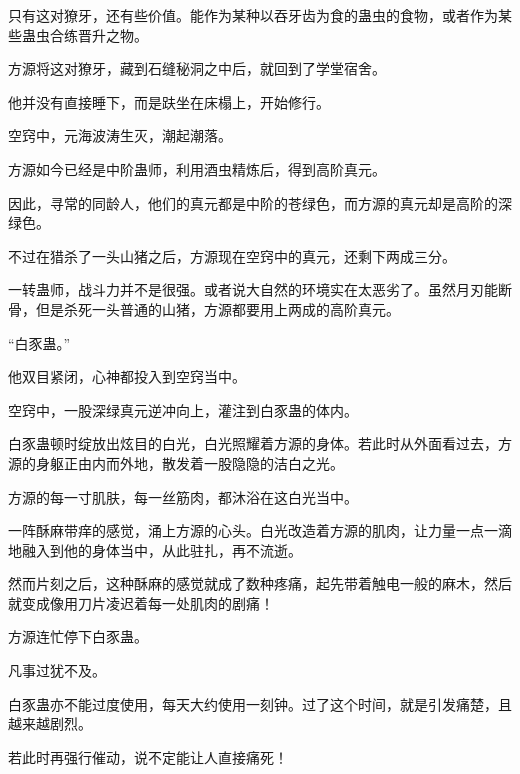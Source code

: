 \begin{this_body}
只有这对獠牙，还有些价值。能作为某种以吞牙齿为食的蛊虫的食物，或者作为某些蛊虫合练晋升之物。

方源将这对獠牙，藏到石缝秘洞之中后，就回到了学堂宿舍。

他并没有直接睡下，而是趺坐在床榻上，开始修行。

空窍中，元海波涛生灭，潮起潮落。

方源如今已经是中阶蛊师，利用酒虫精炼后，得到高阶真元。

因此，寻常的同龄人，他们的真元都是中阶的苍绿色，而方源的真元却是高阶的深绿色。

不过在猎杀了一头山猪之后，方源现在空窍中的真元，还剩下两成三分。

一转蛊师，战斗力并不是很强。或者说大自然的环境实在太恶劣了。虽然月刃能断骨，但是杀死一头普通的山猪，方源都要用上两成的高阶真元。

“白豕蛊。”

他双目紧闭，心神都投入到空窍当中。

空窍中，一股深绿真元逆冲向上，灌注到白豕蛊的体内。

白豕蛊顿时绽放出炫目的白光，白光照耀着方源的身体。若此时从外面看过去，方源的身躯正由内而外地，散发着一股隐隐的洁白之光。

方源的每一寸肌肤，每一丝筋肉，都沐浴在这白光当中。

一阵酥麻带痒的感觉，涌上方源的心头。白光改造着方源的肌肉，让力量一点一滴地融入到他的身体当中，从此驻扎，再不流逝。

然而片刻之后，这种酥麻的感觉就成了数种疼痛，起先带着触电一般的麻木，然后就变成像用刀片凌迟着每一处肌肉的剧痛！

方源连忙停下白豕蛊。

凡事过犹不及。

白豕蛊亦不能过度使用，每天大约使用一刻钟。过了这个时间，就是引发痛楚，且越来越剧烈。

若此时再强行催动，说不定能让人直接痛死！

\end{this_body}

